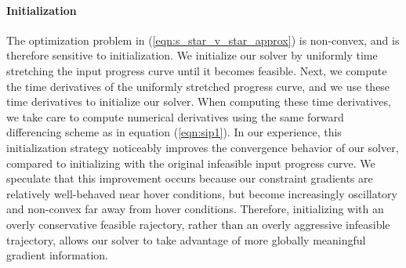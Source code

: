 \paragraph{Initialization}

The optimization problem in (\ref{eqn:s_star_v_star_approx}) is non-convex, and is therefore sensitive to initialization.
We initialize our solver by uniformly time stretching the input progress curve until it becomes feasible.
Next, we compute the time derivatives of the uniformly stretched progress curve, and we use these time derivatives to initialize our solver.
When computing these time derivatives, we take care to compute numerical derivatives using the same forward differencing scheme as in equation (\ref{eqn:sip1}).
In our experience, this initialization strategy noticeably improves the convergence behavior of our solver, compared to initializing with the original infeasible input progress curve.
We speculate that this improvement occurs because our constraint gradients are relatively well-behaved near hover conditions, but become increasingly oscillatory and non-convex far away from hover conditions.
Therefore, initializing with an overly conservative feasible rajectory, rather than an overly aggressive infeasible trajectory, allows our solver to take advantage of more globally meaningful gradient information.

